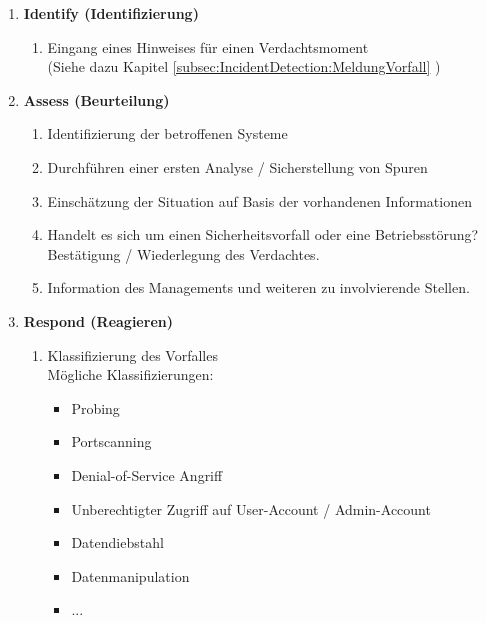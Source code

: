 \begin{enumerate}
\item \textbf{Identify (Identifizierung)}\\
\begin{enumerate}
\item Eingang eines Hinweises für einen Verdachtsmoment \\(Siehe dazu Kapitel \ref{subsec:IncidentDetection:MeldungVorfall} )
\end{enumerate}

\item \textbf{Assess (Beurteilung)}\\
\begin{enumerate}
\item Identifizierung der betroffenen Systeme
\item Durchführen einer ersten Analyse / Sicherstellung von Spuren
\item Einschätzung der Situation auf Basis der vorhandenen Informationen
\item Handelt es sich um einen Sicherheitsvorfall oder eine Betriebsstörung? \\Bestätigung / Wiederlegung des Verdachtes.
\item Information des Managements und weiteren zu involvierende Stellen.
\end{enumerate}

\item \textbf{Respond (Reagieren)}\\
\begin{enumerate}
\item Klassifizierung des Vorfalles \\
Mögliche Klassifizierungen:
\begin{itemize}
\item Probing
\item Portscanning
\item Denial-of-Service Angriff
\item Unberechtigter Zugriff auf User-Account / Admin-Account
\item Datendiebstahl
\item Datenmanipulation
\item ...
\end{itemize}


\end{enumerate}
\end{enumerate}
